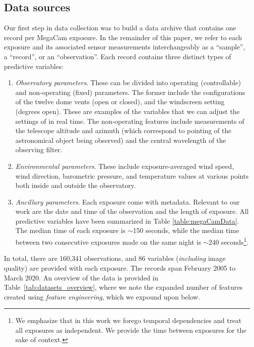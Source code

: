 \subsection{Data sources}\label{sec:rawData}
Our first step in data collection was to build a data archive that contains one record per MegaCam exposure. In the remainder of this paper, we refer to each exposure and its associated sensor measurements interchangeably as a ``sample'', a ``record'', or an ``observation''. Each record contains three distinct types of predictive variables: 
\begin{enumerate}
    \item \textit{Observatory parameters}. These can be divided into operating (controllable) and non-operating (fixed) parameters. The former include the configurations of the twelve dome vents (open or closed), and the windscreen setting (degrees open).  These are examples of the variables that we can adjust the settings of in real time. The non-operating features include measurements of the telescope altitude and azimuth (which correspond to pointing of the astronomical object being observed) and the central wavelength of the observing filter.
    \item \textit{Environmental parameters}. These include exposure-averaged wind speed, wind direction, barometric pressure, and temperature values at various points both inside and outside the observatory. 
    \item \textit{Ancillary parameters}. Each exposure come with metadata. Relevant to our work are the date and time of the observation and the length of exposure. All predictive variables have been summarized in Table \ref{table:megaCamData}.
The median time of each exposure is $\sim$150 seconds, while the median time between two consecutive exposures made on the same night is $\sim$240 seconds\footnote{We emphasize that in this work we forego temporal dependencies and treat all exposures as independent. We provide the time between exposures for the sake of context.}. 
\end{enumerate}

In total, there are 160,341 observations, and 86 variables (\textit{including} image quality) are provided with each exposure. The records span February 2005 to March 2020. An overview of the data is provided in Table~\ref{tab:datasets_overview}, where we note the expanded number of features created using {\it feature engineering}, which we expound upon below.

